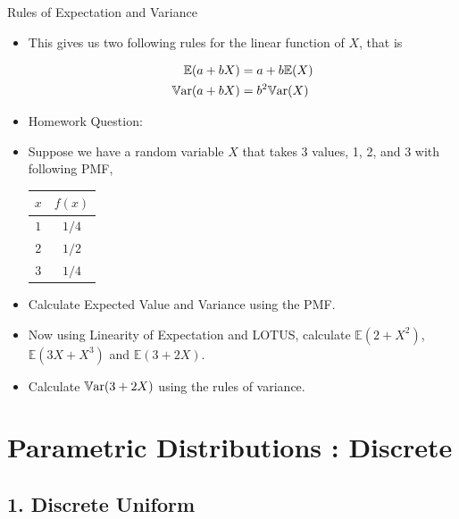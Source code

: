 \documentclass[8pt, usepdftitle = false]{beamer}
\begin{document}
\begin{frame}[allowframebreaks]{Rules of Expectation and Variance}
\begin{itemize}
\framebreak

\item This gives us two following rules for the linear function of $X$, that is 

\begin{align*}
\mathbb{E}(a + bX) &= a + b \mathbb{E}(X) \\
\mathbb{V}\mathrm{ar}{(}a + bX) &= b^2 \mathbb{V}\mathrm{ar}{(}X) \\
\end{align*}





\framebreak




\item[] \alert{Homework Question:}
\medskip

\item Suppose we have a random variable $X$ that takes 3 values, 1, 2, and 3 with following PMF, 

\begin{table}[H]
\centering
	\begin{tabular}{c|c}
$x$ & $f(x)$ \\
\hline $1$ & $1 / 4$ \\
$2$ &  $1/2$  \\
$3$ & $1/4$
\end{tabular}
\end{table}


\item Calculate Expected Value and Variance using the PMF. 

\item Now using Linearity of Expectation and LOTUS, calculate $\mathbb{E}(2 + X^2)$, $\mathbb{E}(3X + X^3)$ and $\mathbb{E}(3 + 2X)$.

\item Calculate $\mathbb{V}\mathrm{ar}{(}3 + 2X)$ using the rules of variance.


\end{itemize}







\end{frame}


\section{Parametric Distributions : Discrete}
\frame{\sectionpage}

\subsection{1. Discrete Uniform}
\frame{\subsectionpage}
\end{document}
